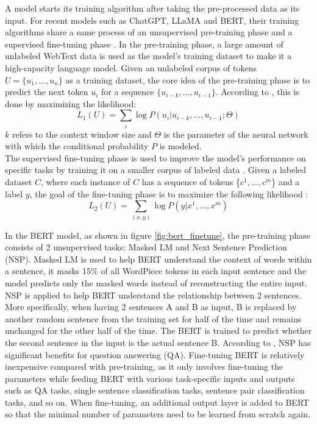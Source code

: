 \documentclass[runningheads]{llncs}
\begin{document}
\noindent \newline
A model starts its training algorithm after taking the pre-processed data as its input. For recent models such as ChatGPT, LLaMA and BERT, their training algorithms share a same process of an unsupervised pre-training phase and a supervised fine-tuning phase \cite{Roum23}.
In the pre-training phase, a large amount of unlabeled WebText data is used as the model's training dataset to make it a high-capacity language model. Given an unlabeled corpus of tokens $U=\{u_1,...,u_n\}$ as a training dataset, the core idea of the pre-training phase is to 
predict the next token $u_i$ for a sequence $\{u_{i-k},...,u_{i-1}\}$. According to \cite{Radford18}, this is done by maximizing the likelihood: 
\begin{equation}
  L_1(U) = \sum_{i}\log{P(u_i|u_{i-k},...,u_{i-1}; \Theta)}
\end{equation}
$k$ refers to the context window size and $\Theta$ is the parameter of the neural network with which the conditional probability $P$ is modeled. \\
\noindent \newline
The supervised fine-tuning phase is used to improve the model's performance on specific tasks by training it on a smaller corpus of labeled data \cite{Roum23}. Given a labeled dataset $C$,
where each instance of $C$ has a sequence of tokens \{$c^1,...,c^m$\} and a label $y$, the goal of the fine-tuning phase is to maximize the following likelihood \cite{Radford18}:
\begin{equation}
  L_2(U) = \sum_{(x,y)}\log{P(y|x^1,...,x^m)}
\end{equation}

\noindent \newline
In the BERT model, as shown in figure \ref{fig:bert_finetune}, the pre-training phase consists of 2 unsupervised tasks: Masked LM and Next Sentence Prediction (NSP).
Masked LM is used to help BERT understand the context of words within a sentence, it masks 15\% of all WordPiece tokens in each input sentence and the model 
predicts only the masked words instead of reconstructing the entire input. NSP is applied to help BERT understand the relationship between 2 sentences. More specifically, when 
having 2 sentences A and B as input, B is replaced by another random sentence from the training set for half of the time and remains unchanged for the other half of the time.
The BERT is trained to predict whether the second sentence in the input is the actual sentence B. According to \cite{Devlin18}, NSP has significant benefits for question answering (QA).
Fine-tuning BERT is relatively inexpensive compared with pre-training, as it only involves fine-tuning the parameters while feeding BERT with various task-specific inputs and outputs 
such as QA tasks, single sentence classification tasks, sentence pair classification tasks, and so on. When fine-tuning, an additional output layer is added to BERT so that the minimal number of 
parameters need to be learned from scratch again.
\end{document}
